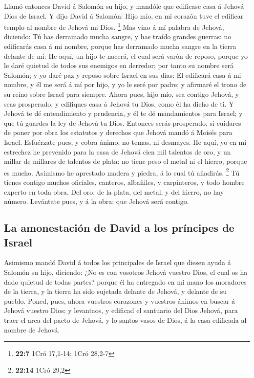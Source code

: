  Llamó entonces David á Salomón su hijo, y mandóle que
edificase casa á Jehová Dios de Israel.  Y dijo David á
Salomón: Hijo mío, en mi corazón tuve el edificar templo al nombre de
Jehová mi Dios. \footnote{\textbf{22:7} 1Cró 17,1-14; 1Cró 28,2-7}
 Mas vino á mí palabra de Jehová, diciendo: Tú has
derramado mucha sangre, y has traído grandes guerras: no edificarás casa
á mi nombre, porque has derramado mucha sangre en la tierra delante de
mí:  He aquí, un hijo te nacerá, el cual será varón de
reposo, porque yo le daré quietud de todos sus enemigos en derredor; por
tanto su nombre será Salomón; y yo daré paz y reposo sobre Israel en sus
días:  El edificará casa á mi nombre, y él me será á mí
por hijo, y yo le seré por padre; y afirmaré el trono de su reino sobre
Israel para siempre.  Ahora pues, hijo mío, sea contigo
Jehová, y seas prosperado, y edifiques casa á Jehová tu Dios, como él ha
dicho de ti.  Y Jehová te dé entendimiento y prudencia, y
él te dé mandamientos para Israel; y que tú guardes la ley de Jehová tu
Dios.  Entonces serás prosperado, si cuidares de poner
por obra los estatutos y derechos que Jehová mandó á Moisés para Israel.
Esfuérzate pues, y cobra ánimo; no temas, ni desmayes. 
He aquí, yo en mi estrechez he prevenido para la casa de Jehová cien mil
talentos de oro, y un millar de millares de talentos de plata: no tiene
peso el metal ni el hierro, porque es mucho. Asimismo he aprestado
madera y piedra, á lo cual tú añadirás. \footnote{\textbf{22:14} 1Cró
  29,2}  Tú tienes contigo muchos oficiales, canteros,
albañiles, y carpinteros, y todo hombre experto en toda obra.
 Del oro, de la plata, del metal, y del hierro, no hay
número. Levántate pues, y á la obra; que Jehová será contigo.

\hypertarget{la-amonestaciuxf3n-de-david-a-los-pruxedncipes-de-israel}{%
\subsection{La amonestación de David a los príncipes de
Israel}\label{la-amonestaciuxf3n-de-david-a-los-pruxedncipes-de-israel}}

 Asimismo mandó David á todos los principales de Israel
que diesen ayuda á Salomón su hijo, diciendo:  ¿No es con
vosotros Jehová vuestro Dios, el cual os ha dado quietud de todas
partes? porque él ha entregado en mi mano los moradores de la tierra, y
la tierra ha sido sujetada delante de Jehová, y delante de su pueblo.
 Poned, pues, ahora vuestros corazones y vuestros ánimos
en buscar á Jehová vuestro Dios; y levantaos, y edificad el santuario
del Dios Jehová, para traer el arca del pacto de Jehová, y lo santos
vasos de Dios, á la casa edificada al nombre de Jehová.

